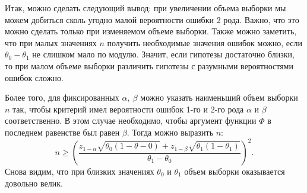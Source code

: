 Итак, можно сделать следующий вывод: при увеличении объема выборки
мы можем добиться сколь угодно малой вероятности ошибки 2 рода.
Важно, что это можно сделать только при изменяемом объеме выборки.
Также можно заметить, что при малых значениях $n$ получить необходимые
значения ошибок можно, если $\theta_0 - \theta_1$ не слишком мало по
модулю. Значит, если гипотезы достаточно близки, то при малом объеме
выборки различить гипотезы с разумными вероятностями ошибок сложно.

Более того, для фиксированных $\alpha,\ \beta$ можно указать
наименьший объем выборки $n$ так, чтобы критерий имел вероятности
ошибок 1-го и 2-го рода $\alpha$ и $\beta$ соответственно. В этом
случае необходимо, чтобы аргумент функции $\Phi$ в последнем
равенстве был равен $\beta$. Тогда можно выразить $n$:
\[
    n \geqslant \left( \frac{z_{1-\alpha} \sqrt{\theta_0(1-\theta-0)}
    + z_{1-\beta}\sqrt{\theta_1(1-\theta_1)}}{\theta_1 - \theta_0}
    \right)^2.
    \]
Снова видим, что при близких значениях $\theta_0$ и $\theta_1$ объем
выборки оказывается довольно велик.
